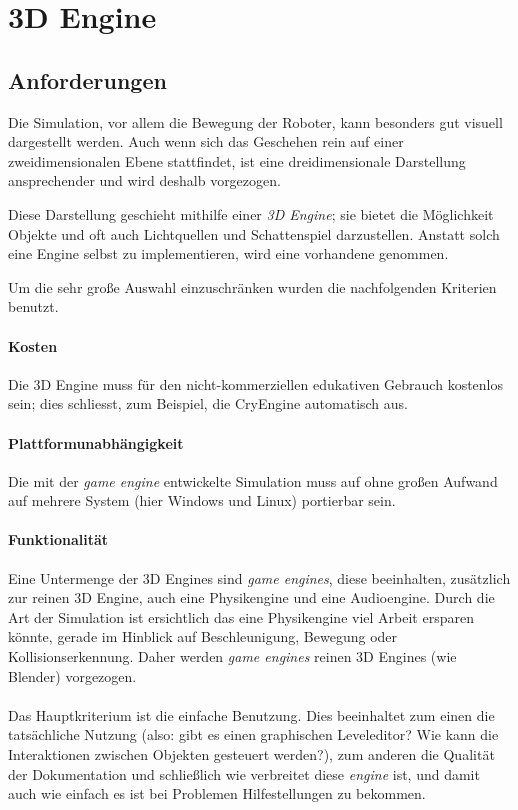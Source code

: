 \clearpage
\section{3D Engine}
\subsection{Anforderungen}
Die Simulation, vor allem die Bewegung der Roboter, kann besonders gut visuell dargestellt werden. Auch wenn sich das Geschehen rein auf einer zweidimensionalen Ebene stattfindet, ist eine dreidimensionale
Darstellung ansprechender und wird deshalb vorgezogen.

Diese Darstellung geschieht mithilfe einer \textit{3D Engine}; sie bietet die M{\"{o}}glichkeit Objekte und oft auch Lichtquellen und Schattenspiel darzustellen.
Anstatt solch eine Engine selbst zu implementieren, wird eine vorhandene genommen.

Um die sehr gro{\ss}e Auswahl einzuschr{\"{a}}nken wurden die nachfolgenden Kriterien benutzt.

\paragraph{Kosten} Die 3D Engine muss f{\"{u}}r den nicht-kommerziellen edukativen Gebrauch kostenlos sein; dies schliesst, zum Beispiel, die CryEngine\cite{cryengine} automatisch aus.

\paragraph{Plattformunabh{\"{a}}ngigkeit} Die mit der \textit{game engine} entwickelte Simulation muss auf ohne gro{\ss}en Aufwand auf mehrere System (hier Windows und Linux) portierbar sein.

\paragraph{Funktionalit{\"{a}}t} Eine Untermenge der 3D Engines sind \textit{game engines}, diese beeinhalten, zus{\"{a}}tzlich zur reinen 3D Engine, auch eine Physikengine und eine Audioengine.
Durch die Art der Simulation ist ersichtlich das eine Physikengine viel Arbeit ersparen k{\"{o}}nnte, gerade im Hinblick auf Beschleunigung, Bewegung oder Kollisionserkennung. Daher werden \textit{game engines} reinen 3D Engines (wie Blender) vorgezogen.

\paragraph{} Das Hauptkriterium ist die einfache Benutzung. Dies beeinhaltet zum einen die
tats{\"{a}}chliche Nutzung (also: gibt es einen graphischen Leveleditor? Wie kann die Interaktionen zwischen
Objekten gesteuert werden?), zum anderen die Qualit{\"{a}}t der Dokumentation und schließlich wie verbreitet diese
\textit{engine} ist, und damit auch wie einfach es ist bei Problemen Hilfestellungen zu bekommen.

